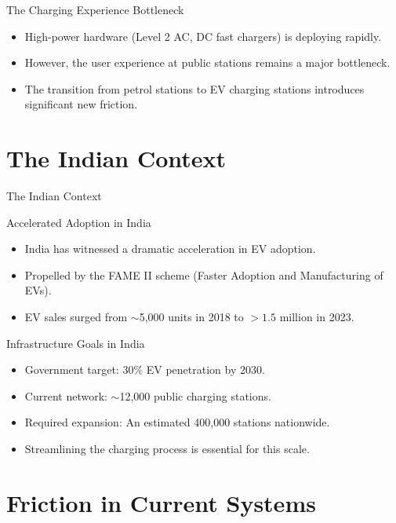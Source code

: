 \documentclass{beamer}
\begin{document}
\begin{frame}{The Charging Experience Bottleneck}
\begin{itemize}
    \item High-power hardware (Level 2 AC, DC fast chargers) is deploying rapidly.
    \item However, the user experience at public stations remains a major bottleneck.
    \item The transition from petrol stations to EV charging stations introduces significant new friction.
\end{itemize}
\end{frame}

\section{The Indian Context}

\begin{frame}
    \centering
    \Huge The Indian Context
\end{frame}

\begin{frame}{Accelerated Adoption in India}
\begin{itemize}
    \item India has witnessed a dramatic acceleration in EV adoption.
    \item Propelled by the FAME II scheme (Faster Adoption and Manufacturing of EVs).
    \item EV sales surged from $\sim$5,000 units in 2018 to $>1.5$ million in 2023.
\end{itemize}
\end{frame}

\begin{frame}{Infrastructure Goals in India}
\begin{itemize}
    \item Government target: 30\% EV penetration by 2030.
    \item Current network: $\sim$12,000 public charging stations.
    \item Required expansion: An estimated 400,000 stations nationwide.
    \item Streamlining the charging process is essential for this scale.
\end{itemize}
\end{frame}

\section{Friction in Current Systems}
\end{document}

